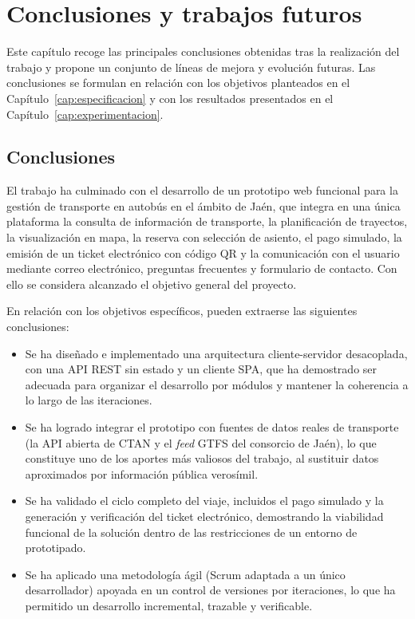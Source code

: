 \chapter{Conclusiones y trabajos futuros}
\label{cap:conclusiones}

Este capítulo recoge las principales conclusiones obtenidas tras la realización del trabajo y propone un conjunto de líneas de mejora y evolución futuras. Las conclusiones se formulan en relación con los objetivos planteados en el Capítulo~\ref{cap:especificacion} y con los resultados presentados en el Capítulo~\ref{cap:experimentacion}.


\section{Conclusiones}
\label{sec:conclusiones}

El trabajo ha culminado con el desarrollo de un prototipo web funcional para la gestión de transporte en autobús en el ámbito de Jaén, que integra en una única plataforma la consulta de información de transporte, la planificación de trayectos, la visualización en mapa, la reserva con selección de asiento, el pago simulado, la emisión de un ticket electrónico con código QR y la comunicación con el usuario mediante correo electrónico, preguntas frecuentes y formulario de contacto. Con ello se considera alcanzado el objetivo general del proyecto.

En relación con los objetivos específicos, pueden extraerse las siguientes conclusiones:

\begin{itemize}
  \item Se ha diseñado e implementado una arquitectura cliente-servidor desacoplada, con una API REST sin estado y un cliente SPA, que ha demostrado ser adecuada para organizar el desarrollo por módulos y mantener la coherencia a lo largo de las iteraciones.
  \item Se ha logrado integrar el prototipo con fuentes de datos reales de transporte (la API abierta de CTAN y el \textit{feed} GTFS del consorcio de Jaén), lo que constituye uno de los aportes más valiosos del trabajo, al sustituir datos aproximados por información pública verosímil.
  \item Se ha validado el ciclo completo del viaje, incluidos el pago simulado y la generación y verificación del ticket electrónico, demostrando la viabilidad funcional de la solución dentro de las restricciones de un entorno de prototipado.
  \item Se ha aplicado una metodología ágil (Scrum adaptada a un único desarrollador) apoyada en un control de versiones por iteraciones, lo que ha permitido un desarrollo incremental, trazable y verificable.
\end{itemize}


